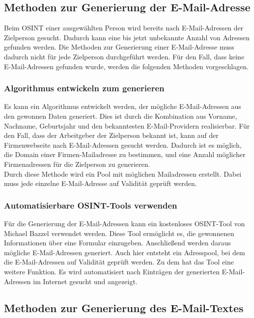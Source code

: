 	\subsection{Methoden zur Generierung der E-Mail-Adresse}
	
	Beim OSINT einer ausgewählten Person wird bereits nach E-Mail-Adressen der Zielperson gesucht. Dadurch kann eine bis jetzt unbekannte Anzahl von Adressen gefunden werden. Die Methoden zur Generierung einer E-Mail-Adresse muss dadurch nicht für jede Zielperson durchgeführt werden. Für den Fall, dass keine E-Mail-Adressen gefunden wurde, werden die folgenden Methoden vorgeschlagen.
	
		\subsubsection{Algorithmus entwickeln zum generieren}
		Es kann ein Algorithmus entwickelt werden, der mögliche E-Mail-Adressen aus den gewonnen Daten generiert. Dies ist durch die Kombination aus Vorname, Nachname, Geburtsjahr und den bekanntesten E-Mail-Providern realisierbar. Für den Fall, dass der Arbeitgeber der Zielperson bekannt ist, kann auf der Firmenwebseite nach E-Mail-Adressen gesucht werden. Dadurch ist es möglich, die Domain einer Firmen-Mailadresse zu bestimmen, und eine Anzahl möglicher Firmenadressen für die Zielperson zu generieren.\\
		Durch diese Methode wird ein Pool mit möglichen Mailadressen erstellt. Dabei muss jede einzelne E-Mail-Adresse auf Validität geprüft werden.

		
		\subsubsection{Automatisierbare OSINT-Tools verwenden}
		Für die Generierung der E-Mail-Adressen kann ein kostenloses OSINT-Tool von Michael Bazzel verwendet werden. Diese Tool ermöglicht es, die gewonnenen Informationen über eine Formular einzugeben. Anschließend werden daraus mögliche E-Mail-Adressen generiert. Auch hier entsteht ein Adresspool, bei dem die E-Mail-Adressen auf Validität geprüft werden. Zu dem hat das Tool eine weitere Funktion. Es wird automatisiert nach Einträgen der generierten E-Mail-Adressen im Internet gesucht und angezeigt. \cite{EmailAssumptions}
		
	\subsection{Methoden zur Generierung des E-Mail-Textes}
